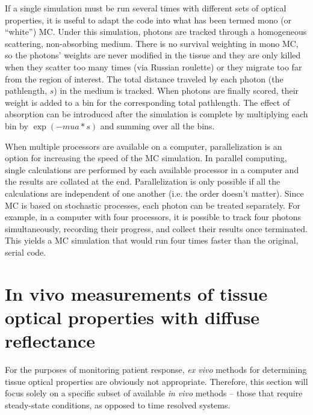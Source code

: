 If a single simulation must be run several times with different sets of optical properties, it is useful to adapt the code into what has been termed mono (or “white”) MC.\cite{Kienle1996a,Alerstam2013} Under this simulation, photons are tracked through a homogeneous scattering, non-absorbing medium. There is no survival weighting in mono MC, so the photons' weights are never modified in the tissue and they are only killed when they scatter too many times (via Russian roulette) or they migrate too far from the region of interest. The total distance traveled by each photon (the pathlength, $s$) in the medium is tracked. When photons are finally scored, their weight is added to a bin for the corresponding total pathlength. The effect of absorption can be introduced after the simulation is complete by multiplying each bin by $\exp(-mua*s)$ and summing over all the bins.

When multiple processors are available on a computer, parallelization is an option for increasing the speed of the MC simulation. In parallel computing, single calculations are performed by each available processor in a computer and the results are collated at the end. Parallelization is only possible if all the calculations are independent of one another (i.e. the order doesn't matter). Since MC is based on stochastic processes, each photon can be treated separately. For example, in a computer with four processors, it is possible to track four photons simultaneously, recording their progress, and collect their results once terminated. This yields a MC simulation that would run four times faster than the original, serial code.

\section{In vivo measurements of tissue optical properties with diffuse reflectance}
\label{sec:diff_refl}
For the purposes of monitoring patient response, \emph{ex vivo} methods for determining tissue optical properties are obviously not appropriate. Therefore, this section will focus solely on a specific subset of available \emph{in vivo} methods – those that require steady-state conditions, as opposed to time resolved systems.

